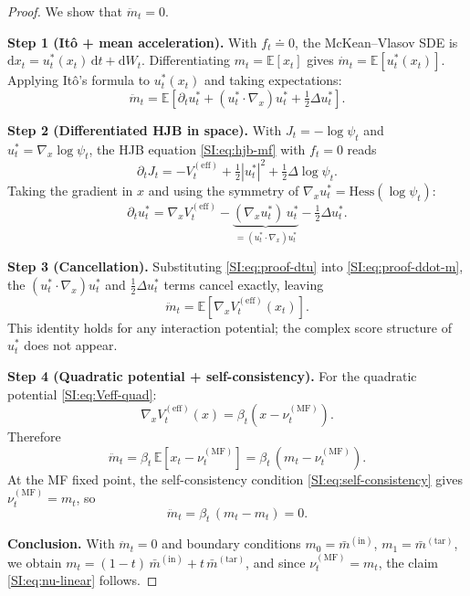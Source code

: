 \documentclass[10pt,a4paper]{amsart}
\newcommand{\MF}{\mathrm{MF}}
\newcommand{\Veff}{V^{(\mathrm{eff})}}
\newcommand{\dd}{\mathrm{d}}
\begin{document}
\begin{proof}
We show that $\ddot m_t = 0$.
\medskip

\noindent\textbf{Step 1 (It\^o + mean acceleration).}
With $f_t\doteq 0$, the McKean--Vlasov SDE is
$\dd x_t = u_t^*(x_t)\,\dd t + \dd W_t$.
Differentiating $m_t = \mathbb{E}[x_t]$ gives
$\dot m_t = \mathbb{E}[u_t^*(x_t)]$.
Applying It\^o's formula to $u_t^*(x_t)$ and taking expectations:
\begin{equation}
  \ddot m_t
  = \mathbb{E}\!\left[
      \partial_t u_t^*
      + (u_t^*\cdot\nabla_x)u_t^*
      + \tfrac{1}{2}\Delta u_t^*
    \right].
  \label{SI:eq:proof-ddot-m}
\end{equation}

\noindent\textbf{Step 2 (Differentiated HJB in space).} With $J_t = -\log\psi_t$ and $u_t^* = \nabla_x\log\psi_t$, the HJB equation \eqref{SI:eq:hjb-mf} with $f_t=0$ reads
\begin{equation*}
  \partial_t J_t= -\Veff_t + \tfrac{1}{2}|u_t^*|^2 + \tfrac{1}{2}\Delta\log\psi_t.
\end{equation*}
Taking the gradient in $x$ and using the symmetry of $\nabla_xu_t^* = \mathrm{Hess}(\log\psi_t)$:
\begin{equation}
  \partial_t u_t^*= \nabla_x\Veff_t- \underbrace{(\nabla_xu_t^*)\,u_t^*}_{=(u_t^*\cdot\nabla_x)u_t^*}- \tfrac{1}{2}\Delta u_t^*.
  \label{SI:eq:proof-dtu}
\end{equation}

\noindent\textbf{Step 3 (Cancellation).} Substituting \eqref{SI:eq:proof-dtu} into \eqref{SI:eq:proof-ddot-m}, the $(u_t^*\cdot\nabla_x)u_t^*$ and $\tfrac{1}{2}\Delta u_t^*$ terms cancel exactly, leaving
\begin{equation*}
  \ddot m_t = \mathbb{E}\!\left[\nabla_x\Veff_t(x_t)\right].
\end{equation*}
This identity holds for any interaction potential; the complex score structure of $u_t^*$ does not appear.

\noindent\textbf{Step 4 (Quadratic potential + self-consistency).} For the quadratic potential \eqref{SI:eq:Veff-quad}:
\begin{equation*}
  \nabla_x\Veff_t(x) = \beta_t(x - \nu_t^{(\MF)}).
\end{equation*}
Therefore
\begin{equation*}
  \ddot m_t
  = \beta_t\,\mathbb{E}[x_t - \nu_t^{(\MF)}]
  = \beta_t\,(m_t - \nu_t^{(\MF)}).
\end{equation*}
At the MF fixed point, the self-consistency condition
\eqref{SI:eq:self-consistency} gives $\nu_t^{(\MF)} = m_t$, so
\begin{equation*}
  \ddot m_t = \beta_t\,(m_t - m_t) = 0.
\end{equation*}

\noindent\textbf{Conclusion.}
With $\ddot m_t = 0$ and boundary conditions
$m_0 = \bar m^{(\mathrm{in})}$, $m_1 = \bar m^{(\mathrm{tar})}$,
we obtain $m_t = (1-t)\,\bar m^{(\mathrm{in})} + t\,\bar m^{(\mathrm{tar})}$,
and since $\nu_t^{(\MF)} = m_t$, the claim \eqref{SI:eq:nu-linear} follows.
\end{proof}
\end{document}
